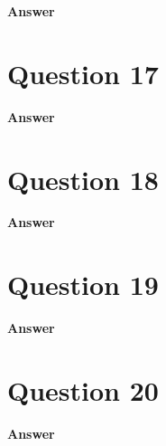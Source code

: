 \documentclass[letterpaper]{article}
\begin{document}
\textbf{Answer}

\clearpage

\section{Question 17}

\textbf{Answer}

\clearpage

\section{Question 18}

\textbf{Answer}

\clearpage

\section{Question 19}

\textbf{Answer}

\clearpage

\section{Question 20}

\textbf{Answer}

\clearpage
		
	
\end{document}
